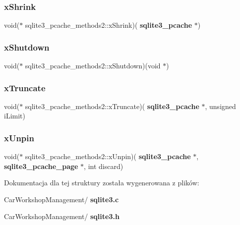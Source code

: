 \subsubsection{xShrink}
{\footnotesize\ttfamily void($\ast$ sqlite3\+\_\+pcache\+\_\+methods2\+::x\+Shrink)(\textbf{ sqlite3\+\_\+pcache} $\ast$)}

\mbox{\label{structsqlite3__pcache__methods2_a00a780e295b89976940cd3cba2cfeaee}} 
\subsubsection{xShutdown}
{\footnotesize\ttfamily void($\ast$ sqlite3\+\_\+pcache\+\_\+methods2\+::x\+Shutdown)(void $\ast$)}

\mbox{\label{structsqlite3__pcache__methods2_a7c565709ab91dbe7feb5b82c684ba604}} 
\subsubsection{xTruncate}
{\footnotesize\ttfamily void($\ast$ sqlite3\+\_\+pcache\+\_\+methods2\+::x\+Truncate)(\textbf{ sqlite3\+\_\+pcache} $\ast$, unsigned i\+Limit)}

\mbox{\label{structsqlite3__pcache__methods2_ac94294551eda282f17b1ed2a110e1850}} 
\subsubsection{xUnpin}
{\footnotesize\ttfamily void($\ast$ sqlite3\+\_\+pcache\+\_\+methods2\+::x\+Unpin)(\textbf{ sqlite3\+\_\+pcache} $\ast$, \textbf{ sqlite3\+\_\+pcache\+\_\+page} $\ast$, int discard)}



Dokumentacja dla tej struktury została wygenerowana z plików\+:\begin{DoxyCompactItemize}
\item 
Car\+Workshop\+Management/\textbf{ sqlite3.\+c}\item 
Car\+Workshop\+Management/\textbf{ sqlite3.\+h}\end{DoxyCompactItemize}
